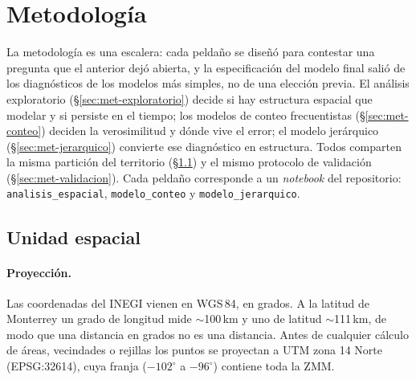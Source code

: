 \section{Metodología}\label{sec:metodologia}

La metodología es una escalera: cada peldaño se diseñó para contestar una
pregunta que el anterior dejó abierta, y la especificación del modelo final
salió de los diagnósticos de los modelos más simples, no de una elección
previa. El análisis exploratorio (§\ref{sec:met-exploratorio}) decide si hay
estructura espacial que modelar y si persiste en el tiempo; los modelos de
conteo frecuentistas (§\ref{sec:met-conteo}) deciden la verosimilitud y dónde
vive el error; el modelo jerárquico (§\ref{sec:met-jerarquico}) convierte ese
diagnóstico en estructura. Todos comparten la misma partición del territorio
(§\ref{sec:met-unidad}) y el mismo protocolo de validación
(§\ref{sec:met-validacion}). Cada peldaño corresponde a un \emph{notebook} del repositorio: \texttt{analisis\_espacial}, \texttt{modelo\_conteo} y
\texttt{modelo\_jerarquico}.

\subsection{Unidad espacial}\label{sec:met-unidad}

\paragraph{Proyección.} Las coordenadas del INEGI vienen en WGS\,84, en
grados. A la latitud de Monterrey un grado de longitud mide $\sim$100\,km y
uno de latitud $\sim$111\,km, de modo que una distancia en grados no es una
distancia. Antes de cualquier cálculo de áreas, vecindades o rejillas los
puntos se proyectan a UTM zona 14 Norte (EPSG:32614), cuya franja
($-102^\circ$ a $-96^\circ$) contiene toda la ZMM.

